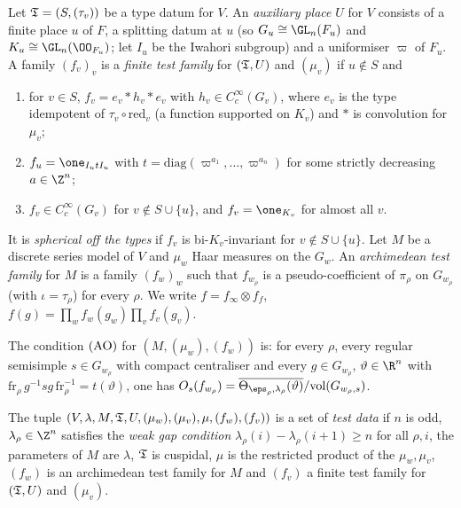 \begin{definition}\label{pf:multnc:def-testfn}
Let $\mathfrak{T}=(S,(\tau_v))$ be a type datum for $V$. An \emph{auxiliary place} $U$ for $V$ consists of a finite place
$u$ of $F$, a splitting datum at $u$ (so $G_u\cong\GL_n(F_u)$ and $K_u\cong\GL_n(\OO_{F_u})$; let $I_u$ be the Iwahori
subgroup) and a uniformiser $\varpi$ of $F_u$. A family $(f_v)_v$ is a \emph{finite test family} for $(\mathfrak{T},U)$ and
$(\mu_v)$ if $u\notin S$ and
\begin{enumerate}[label=(\roman*)]
\item for $v\in S$, $f_v=e_v*h_v*e_v$ with $h_v\in C_c^\infty(G_v)$, where $e_v$ is the type idempotent of
$\tau_v\circ\mathrm{red}_v$ (a function supported on $K_v$) and $*$ is convolution for $\mu_v$;
\item $f_u=\one_{I_utI_u}$ with $t=\mathrm{diag}(\varpi^{a_1},\dots,\varpi^{a_n})$ for some strictly decreasing $a\in\Z^n$;
\item $f_v\in C_c^\infty(G_v)$ for $v\notin S\cup\{u\}$, and $f_v=\one_{K_v}$ for almost all $v$.
\end{enumerate}
It is \emph{spherical off the types} if $f_v$ is bi-$K_v$-invariant for $v\notin S\cup\{u\}$. Let $M$ be a discrete series
model of $V$ and $\mu_w$ Haar measures on the $G_w$. An \emph{archimedean test family} for $M$ is a family $(f_w)_w$ such
that $f_{w_\rho}$ is a pseudo-coefficient of $\pi_\rho$ on $G_{w_\rho}$ (with $\iota=\tau_\rho$) for every $\rho$. We
write $f=f_\infty\otimes f_f$, $f(g)=\prod_wf_w(g_w)\prod_vf_v(g_v)$.
\end{definition}

\begin{definition}\label{pf:multnc:def-archo}
The condition $\textup{(AO)}$ for $(M,(\mu_w),(f_w))$ is: for every $\rho$, every regular semisimple $s\in G_{w_\rho}$ with
compact centraliser and every $g\in G_{w_\rho}$, $\vartheta\in\R^n$ with
$\mathrm{fr}_\rho\,g^{-1}sg\,\mathrm{fr}_\rho^{-1}=t(\vartheta)$, one has
$O_s(f_{w_\rho})=\overline{\Theta_{\eps_\rho,\lambda_\rho}(\vartheta)}/\mathrm{vol}(G_{w_\rho,s})$.
\end{definition}

\begin{definition}\label{pf:multnc:def-testdata}
The tuple $(V,\lambda,M,\mathfrak{T},U,(\mu_w),(\mu_v),\mu,(f_w),(f_v))$ is a set of \emph{test data} if $n$ is odd,
$\lambda_\rho\in\Z^n$ satisfies the \emph{weak gap condition} $\lambda_\rho(i)-\lambda_\rho(i+1)\ge n$ for all $\rho,i$, the
parameters of $M$ are $\lambda$, $\mathfrak{T}$ is cuspidal, $\mu$ is the restricted product of the $\mu_w,\mu_v$, $(f_w)$ is
an archimedean test family for $M$ and $(f_v)$ a finite test family for $(\mathfrak{T},U)$ and $(\mu_v)$.
\end{definition}

